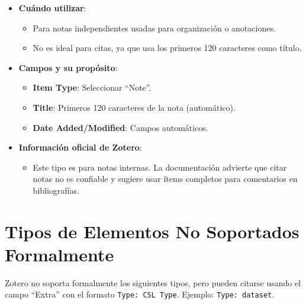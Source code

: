 \documentclass[
  jou,
  floatsintext,
  longtable,
  a4paper,
  nolmodern,
  notxfonts,
  notimes,
  colorlinks=true,linkcolor=blue,citecolor=blue,urlcolor=blue]{apa7}
\providecommand{\tightlist}{%
  \setlength{\itemsep}{0pt}\setlength{\parskip}{0pt}}
\begin{document}
\begin{itemize}
\tightlist
\item
  \textbf{Cuándo utilizar}:

  \begin{itemize}
  \tightlist
  \item
    Para notas independientes usadas para organización o anotaciones.
  \item
    No es ideal para citas, ya que usa los primeros 120 caracteres como
    título.
  \end{itemize}
\item
  \textbf{Campos y su propósito}:

  \begin{itemize}
  \tightlist
  \item
    \textbf{Item Type}: Seleccionar ``Note''.
  \item
    \textbf{Title}: Primeros 120 caracteres de la nota (automático).
  \item
    \textbf{Date Added/Modified}: Campos automáticos.
  \end{itemize}
\item
  \textbf{Información oficial de Zotero}:

  \begin{itemize}
  \tightlist
  \item
    Este tipo es para notas internas. La documentación advierte que
    citar notas no es confiable y sugiere usar ítems completos para
    comentarios en bibliografías.
  \end{itemize}
\end{itemize}

\section{Tipos de Elementos No Soportados
Formalmente}\label{tipos-de-elementos-no-soportados-formalmente}

Zotero no soporta formalmente los siguientes tipos, pero pueden citarse
usando el campo ``Extra'' con el formato \texttt{Type:\ CSL\ Type}.
Ejemplo: \texttt{Type:\ dataset}.
\end{document}
